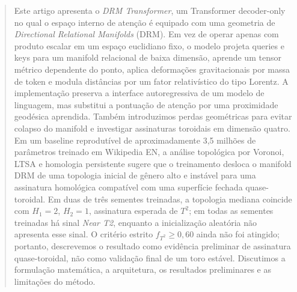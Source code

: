 \begin{abstract}
Este artigo apresenta o \emph{DRM Transformer}, um Transformer decoder-only no
qual o espaço interno de atenção é equipado com uma geometria de
\emph{Directional Relational Manifolds} (DRM). Em vez de operar apenas com
produto escalar em um espaço euclidiano fixo, o modelo projeta queries e keys
para um manifold relacional de baixa dimensão, aprende um tensor métrico
dependente do ponto, aplica deformações gravitacionais por massa de token e
modula distâncias por um fator relativístico do tipo Lorentz. A implementação
preserva a interface autoregressiva de um modelo de linguagem, mas substitui a
pontuação de atenção por uma proximidade geodésica aprendida. Também
introduzimos perdas geométricas para evitar colapso do manifold e investigar
assinaturas toroidais em dimensão quatro. Em um baseline reprodutível de
aproximadamente 3,5 milhões de parâmetros treinado em Wikipedia EN, a análise
topológica por Voronoi, LTSA e homologia persistente sugere que o treinamento
desloca o manifold DRM de uma topologia inicial de gênero alto e instável para
uma assinatura homológica compatível com uma superfície fechada quase-toroidal.
Em duas de três sementes treinadas, a topologia mediana coincide com
$H_1=2$, $H_2=1$, assinatura esperada de $T^2$; em todas as sementes treinadas
há sinal \emph{Near T2}, enquanto a inicialização aleatória não apresenta esse
sinal. O critério estrito $f_{T^2}\geq 0{,}60$ ainda não foi atingido; portanto,
descrevemos o resultado como evidência preliminar de assinatura quase-toroidal,
não como validação final de um toro estável. Discutimos a formulação
matemática, a arquitetura, os resultados preliminares e as limitações do
método.
\end{abstract}
